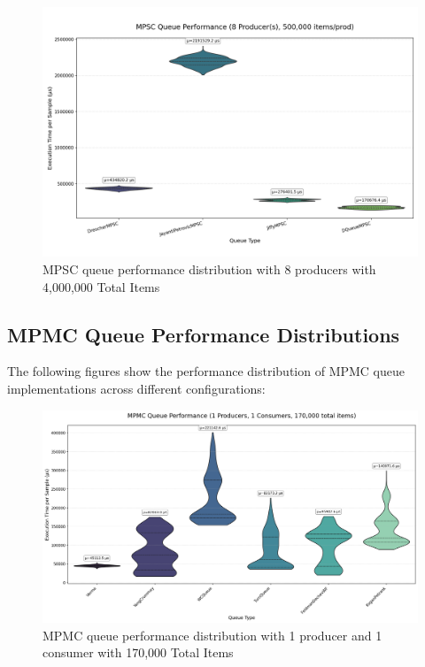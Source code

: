 \begin{figure}[H]
\centering
\caption{MPSC queue performance distribution with 8 producers with 4,000,000 Total Items}
\label{fig:mpsc-violin-8p}
\includegraphics[width=\textwidth]{images/results/mpsc_performance_violin_8_producers.png}
\end{figure}

\subsection{MPMC Queue Performance Distributions}
The following figures show the performance distribution of MPMC queue implementations across different configurations:

\begin{figure}[H]
\centering
\caption{MPMC queue performance distribution with 1 producer and 1 consumer with 170,000 Total Items}
\label{fig:mpmc-violin-1p1c}
\includegraphics[width=\textwidth]{images/results/mpmc_performance_violin_1P_1C.png}
\end{figure}

